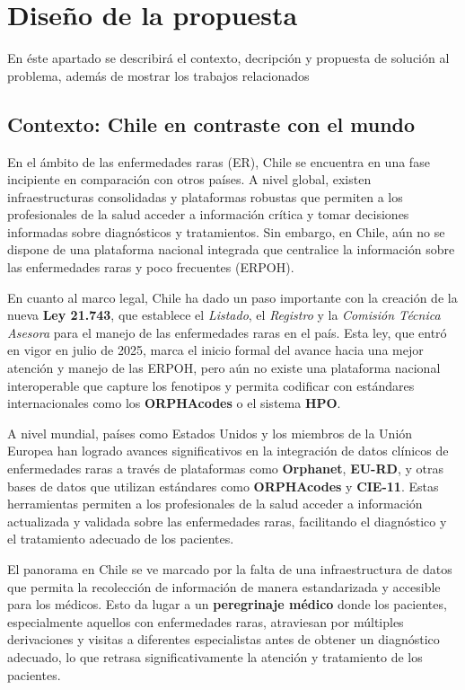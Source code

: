 \documentclass{article}
\begin{document}
\section{Diseño de la propuesta}

En éste apartado se describirá el contexto, decripción y propuesta de solución al problema, además de mostrar los trabajos relacionados


\subsection{Contexto: Chile en contraste con el mundo}

En el ámbito de las enfermedades raras (ER), Chile se encuentra en una fase incipiente en comparación con otros países. A nivel global, existen infraestructuras consolidadas y plataformas robustas que permiten a los profesionales de la salud acceder a información crítica y tomar decisiones informadas sobre diagnósticos y tratamientos. Sin embargo, en Chile, aún no se dispone de una plataforma nacional integrada que centralice la información sobre las enfermedades raras y poco frecuentes (ERPOH).

En cuanto al marco legal, Chile ha dado un paso importante con la creación de la nueva \textbf{Ley 21.743}, que establece el \textit{Listado}, el \textit{Registro} y la \textit{Comisión Técnica Asesora} para el manejo de las enfermedades raras en el país. Esta ley, que entró en vigor en julio de 2025, marca el inicio formal del avance hacia una mejor atención y manejo de las ERPOH, pero aún no existe una plataforma nacional interoperable que capture los fenotipos y permita codificar con estándares internacionales como los \textbf{ORPHAcodes} o el sistema \textbf{HPO}. 

A nivel mundial, países como Estados Unidos y los miembros de la Unión Europea han logrado avances significativos en la integración de datos clínicos de enfermedades raras a través de plataformas como \textbf{Orphanet}, \textbf{EU-RD}, y otras bases de datos que utilizan estándares como \textbf{ORPHAcodes} y \textbf{CIE-11}. Estas herramientas permiten a los profesionales de la salud acceder a información actualizada y validada sobre las enfermedades raras, facilitando el diagnóstico y el tratamiento adecuado de los pacientes.

El panorama en Chile se ve marcado por la falta de una infraestructura de datos que permita la recolección de información de manera estandarizada y accesible para los médicos. Esto da lugar a un \textbf{peregrinaje médico} donde los pacientes, especialmente aquellos con enfermedades raras, atraviesan por múltiples derivaciones y visitas a diferentes especialistas antes de obtener un diagnóstico adecuado, lo que retrasa significativamente la atención y tratamiento de los pacientes.
\end{document}
